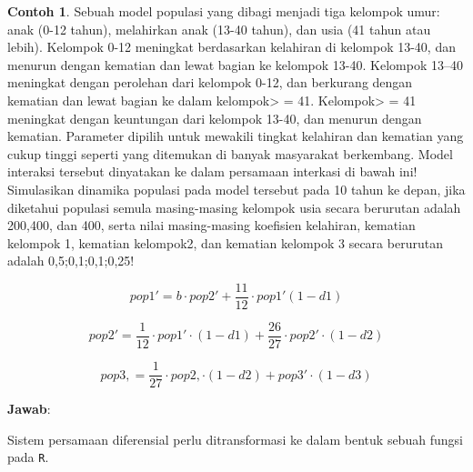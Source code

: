 \documentclass[
]{book}
\theoremstyle{definition}
\theoremstyle{definition}
\newtheorem{example}{Contoh}[chapter]
\theoremstyle{definition}
\theoremstyle{definition}
\theoremstyle{remark}
\begin{document}
\begin{example}
\protect\hypertarget{exm:rksysexmp}{}\label{exm:rksysexmp}Sebuah model populasi yang dibagi menjadi tiga kelompok umur: anak (0-12 tahun), melahirkan anak (13-40 tahun), dan usia (41 tahun atau lebih). Kelompok 0-12 meningkat berdasarkan kelahiran di kelompok 13-40, dan menurun dengan kematian dan lewat bagian ke kelompok 13-40. Kelompok 13--40 meningkat dengan perolehan dari kelompok 0-12, dan berkurang dengan kematian dan lewat bagian ke dalam kelompok\textgreater{} = 41. Kelompok\textgreater{} = 41 meningkat dengan keuntungan dari kelompok 13-40, dan menurun dengan kematian. Parameter dipilih untuk mewakili tingkat kelahiran dan kematian yang cukup tinggi seperti yang ditemukan di banyak masyarakat berkembang. Model interaksi tersebut dinyatakan ke dalam persamaan interkasi di bawah ini! Simulasikan dinamika populasi pada model tersebut pada 10 tahun ke depan, jika diketahui populasi semula masing-masing kelompok usia secara berurutan adalah 200,400, dan 400, serta nilai masing-masing koefisien kelahiran, kematian kelompok 1, kematian kelompok2, dan kematian kelompok 3 secara berurutan adalah 0,5;0,1;0,1;0,25!
\end{example}

\[
pop1' = b\cdot pop2'+\frac{11}{12}\cdot pop1'\left(1-d1\right)  
\]

\[
pop2' = \frac{1}{12}\cdot pop1'\cdot\left(1-d1\right)+\frac{26}{27}\cdot pop2'\cdot \left(1-d2\right)  
\]

\[
pop3, = \frac{1}{27}\cdot pop2,\cdot\left(1-d2\right)+ pop3'\cdot \left(1-d3\right)  
\]

\textbf{Jawab}:

Sistem persamaan diferensial perlu ditransformasi ke dalam bentuk sebuah fungsi pada \texttt{R}.
\end{document}
